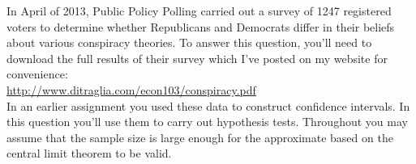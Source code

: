 \documentclass[addpoints,12pt]{exam}\usepackage[]{graphicx}\usepackage[]{color}
\makeatletter
\newcommand{\hlnum}[1]{\textcolor[rgb]{0.686,0.059,0.569}{#1}}%
\newcommand{\hlopt}[1]{\textcolor[rgb]{0,0,0}{#1}}%
\newcommand{\hlstd}[1]{\textcolor[rgb]{0.345,0.345,0.345}{#1}}%
\newcommand{\hlkwb}[1]{\textcolor[rgb]{0.69,0.353,0.396}{#1}}%
\newcommand{\hlkwd}[1]{\textcolor[rgb]{0.737,0.353,0.396}{\textbf{#1}}}%
\newenvironment{kframe}{%
 \def\at@end@of@kframe{}%
 \ifinner\ifhmode%
  \def\at@end@of@kframe{\end{minipage}}%
  \begin{minipage}{\columnwidth}%
 \fi\fi%
 \def\FrameCommand##1{\hskip\@totalleftmargin \hskip-\fboxsep
 \colorbox{shadecolor}{##1}\hskip-\fboxsep
     \hskip-\linewidth \hskip-\@totalleftmargin \hskip\columnwidth}%
 \MakeFramed {\advance\hsize-\width
   \@totalleftmargin\z@ \linewidth\hsize
   \@setminipage}}%
 {\par\unskip\endMakeFramed%
 \at@end@of@kframe}
\newenvironment{knitrout}{}{} %
\makeatother
\begin{document}
\begin{questions}


\question In April of 2013, Public Policy Polling carried out a survey of 1247 registered voters to determine whether Republicans and Democrats differ in their beliefs about various conspiracy theories. To answer this question, you'll need to download the full results of their survey which I've posted on my website for convenience:\\
\url{http://www.ditraglia.com/econ103/conspiracy.pdf}\\
In an earlier assignment you used these data to construct confidence intervals. In this question you'll use them to carry out hypothesis tests. Throughout you may assume that the sample size is large enough for the approximate based on the central limit theorem to be valid.
	\begin{parts}

\end{parts}
\end{questions}
\end{document}
